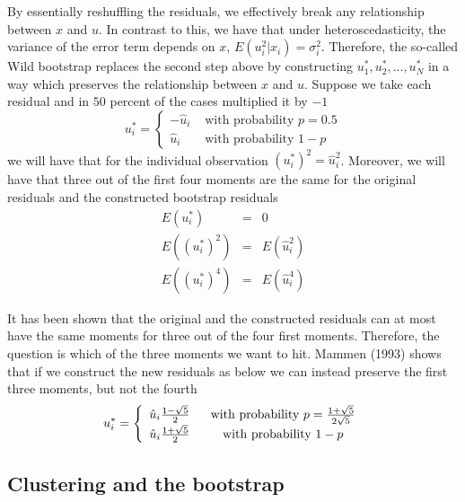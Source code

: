 \documentclass{article}
\begin{document}
By essentially reshuffling the residuals, we effectively break any
relationship between $x$ and $u$. In contrast to this, we have that under
heteroscedasticity, the variance of the error term depends on $x$, $E\left(
u_{i}^{2}|x_{i}\right) =\sigma _{i}^{2}$. Therefore, the so-called Wild
bootstrap replaces the second step above by constructing $u_{1}^{\ast
},u_{2}^{\ast },...,u_{N}^{\ast }$ in a way which preserves the relationship
between $x$ and $u$. Suppose we take each residual and in $50$ percent of
the cases multiplied it by $-1$%
\begin{equation*}
u_{i}^{\ast }=\left\{ 
\begin{array}{cc}
-\hat{u}_{i} & \text{ \ with probability }p=0.5 \\ 
\hat{u}_{i} & \text{ \ with probability }1-p%
\end{array}%
\right.
\end{equation*}%
we will have that for the individual observation $\left( u_{i}^{\ast
}\right) ^{2}=\hat{u}_{i}^{2}$. Moreover, we will have that three out of the
first four moments are the same for the original residuals and the
constructed bootstrap residuals%
\begin{eqnarray*}
E\left( u_{i}^{\ast }\right) &=&0 \\
E\left( \left( u_{i}^{\ast }\right) ^{2}\right) &=&E\left( \hat{u}%
_{i}^{2}\right) \\
E\left( \left( u_{i}^{\ast }\right) ^{4}\right) &=&E\left( \hat{u}%
_{i}^{4}\right)
\end{eqnarray*}

It has been shown that the original and the constructed residuals can at
most have the same moments for three out of the four first moments.
Therefore, the question is which of the three moments we want to hit. Mammen
(1993) shows that if we construct the new residuals as below we can instead
preserve the first three moments, but not the fourth%
\begin{equation*}
u_{i}^{\ast }=\left\{ 
\begin{array}{cc}
\hat{u}_{i}\frac{1-\sqrt{5}}{2} & \text{ \ with probability }p=\frac{1+\sqrt{%
5}}{2\sqrt{5}} \\ 
\hat{u}_{i}\frac{1+\sqrt{5}}{2} & \text{ \ with probability }1-p%
\end{array}%
\right.
\end{equation*}

\subsection{Clustering and the bootstrap}
\end{document}
